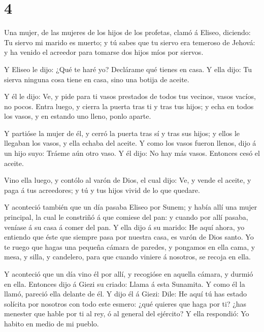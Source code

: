 \hypertarget{section-3}{%
\section{4}\label{section-3}}

 Una mujer, de las mujeres de los hijos de los profetas,
clamó á Eliseo, diciendo: Tu siervo mi marido es muerto; y tú sabes que
tu siervo era temeroso de Jehová: y ha venido el acreedor para tomarse
dos hijos míos por siervos.

 Y Eliseo le dijo: ¿Qué te haré yo? Declárame qué tienes en
casa. Y ella dijo: Tu sierva ninguna cosa tiene en casa, sino una botija
de aceite.

 Y él le dijo: Ve, y pide para ti vasos prestados de todos
tus vecinos, vasos vacíos, no pocos.  Entra luego, y cierra
la puerta tras ti y tras tus hijos; y echa en todos los vasos, y en
estando uno lleno, ponlo aparte.

 Y partióse la mujer de él, y cerró la puerta tras sí y tras
sus hijos; y ellos le llegaban los vasos, y ella echaba del aceite.
 Y como los vasos fueron llenos, dijo á un hijo suyo: Tráeme
aún otro vaso. Y él dijo: No hay más vasos. Entonces cesó el aceite.

 Vino ella luego, y contólo al varón de Dios, el cual dijo:
Ve, y vende el aceite, y paga á tus acreedores; y tú y tus hijos vivid
de lo que quedare.

 Y aconteció también que un día pasaba Eliseo por Sunem; y
había allí una mujer principal, la cual le constriñó á que comiese del
pan: y cuando por allí pasaba, veníase á su casa á comer del pan.
 Y ella dijo á su marido: He aquí ahora, yo entiendo que
éste que siempre pasa por nuestra casa, es varón de Dios santo.
 Yo te ruego que hagas una pequeña cámara de paredes, y
pongamos en ella cama, y mesa, y silla, y candelero, para que cuando
viniere á nosotros, se recoja en ella.

 Y aconteció que un día vino él por allí, y recogióse en
aquella cámara, y durmió en ella.  Entonces dijo á Giezi su
criado: Llama á esta Sunamita. Y como él la llamó, pareció ella delante
de él.  Y dijo él á Giezi: Dile: He aquí tú has estado
solícita por nosotros con todo este esmero: ¿qué quieres que haga por
ti? ¿has menester que hable por ti al rey, ó al general del ejército? Y
ella respondió: Yo habito en medio de mi pueblo.

